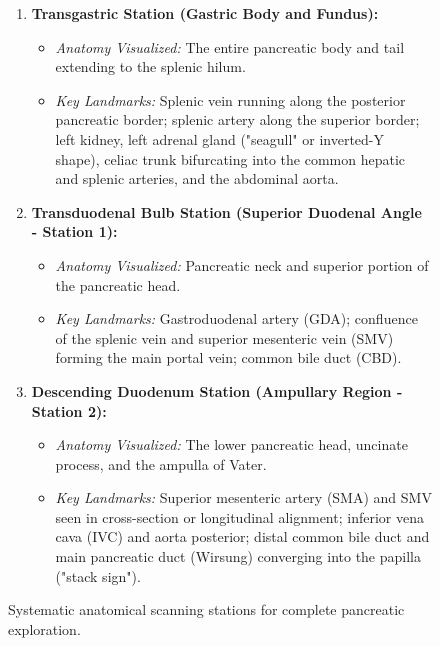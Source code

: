 \documentclass[11pt,a4paper]{article}
\begin{document}
\begin{figure}[htbp]
\centering
\begin{tcolorbox}[colback=teal!5!white,colframe=teal!60!black,title=\textbf{The Three Anatomical EUS Stations for Pancreas Evaluation},width=\linewidth]
\small
\begin{enumerate}[leftmargin=1.5em]
    \item \textbf{Transgastric Station (Gastric Body and Fundus):}
    \begin{itemize}
        \item \textit{Anatomy Visualized:} The entire pancreatic body and tail extending to the splenic hilum.
        \item \textit{Key Landmarks:} Splenic vein running along the posterior pancreatic border; splenic artery along the superior border; left kidney, left adrenal gland ("seagull" or inverted-Y shape), celiac trunk bifurcating into the common hepatic and splenic arteries, and the abdominal aorta.
    \end{itemize}
    \item \textbf{Transduodenal Bulb Station (Superior Duodenal Angle - Station 1):}
    \begin{itemize}
        \item \textit{Anatomy Visualized:} Pancreatic neck and superior portion of the pancreatic head.
        \item \textit{Key Landmarks:} Gastroduodenal artery (GDA); confluence of the splenic vein and superior mesenteric vein (SMV) forming the main portal vein; common bile duct (CBD).
    \end{itemize}
    \item \textbf{Descending Duodenum Station (Ampullary Region - Station 2):}
    \begin{itemize}
        \item \textit{Anatomy Visualized:} The lower pancreatic head, uncinate process, and the ampulla of Vater.
        \item \textit{Key Landmarks:} Superior mesenteric artery (SMA) and SMV seen in cross-section or longitudinal alignment; inferior vena cava (IVC) and aorta posterior; distal common bile duct and main pancreatic duct (Wirsung) converging into the papilla ("stack sign").
    \end{itemize}
\end{enumerate}
\end{tcolorbox}
\caption{Systematic anatomical scanning stations for complete pancreatic exploration.}
\label{fig:pancreas_stations}
\end{figure}
\end{document}

